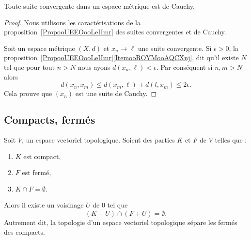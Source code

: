 \begin{proposition}     \label{PROPooZZNWooHghltd}
    Toute suite convergente dans un espace métrique est de Cauchy.
\end{proposition}

\begin{proof}
    Nous utilisons les caractérisations de la proposition~\ref{PropooUEEOooLeIImr} des suites convergentes et de Cauchy.

    Soit un espace métrique \( (X,d)\) et \( x_n\to\ell\) une suite convergente. Si \( \epsilon>0\), la proposition~\ref{PropooUEEOooLeIImr}\ref{ItemooROYMooAQCXnj}, dit qu'il existe \( N\) tel que pour tout \( n>N\) nous ayons \( d(x_n,\ell)<\epsilon\). Par conséquent si \( n,m>N\) alors
    \begin{equation}
        d(x_n,x_m)\leq d(x_m,\ell)+d(l,x_m)\leq 2\epsilon.
    \end{equation}
    Cela prouve que \( (x_n)\) est une suite de Cauchy.
\end{proof}

\subsection{Compacts, fermés}

\begin{proposition}     \label{PROPooRMAOooZIgXwy}
    Soit \( V\), un espace vectoriel topologique. Soient des parties \( K\) et \( F\) de \( V\) telles que :
    \begin{enumerate}
        \item
            \( K\) est compact,
        \item
            \( F\) est fermé,
        \item
            \( K\cap F=\emptyset\).
    \end{enumerate}
    Alors il existe un voisinage \( U\) de \( 0\) tel que
    \begin{equation}
        (K+U)\cap (F+U)=\emptyset.
    \end{equation}
    Autrement dit, la topologie d'un espace vectoriel topologique sépare les fermés des compacts.
\end{proposition}

